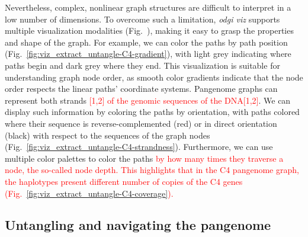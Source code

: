 \documentclass{bioinfo}
\newcommand{\REVIEWED}[1]{{\textcolor{Red}{#1}}}
\begin{document}
Nevertheless, complex, nonlinear graph structures are difficult to interpret in a low number of dimensions.
To overcome such a limitation, \textit{odgi viz} supports multiple visualization modalities (Fig.~), making it easy to grasp the properties and shape of the graph.
For example, we can color the paths by path position (Fig.~\ref{fig:viz_extract_untangle-C4-gradient}), with light grey indicating where paths begin and dark grey where they end.
This visualization is suitable for understanding graph node order, as smooth color gradients indicate that the node order respects the linear paths' coordinate systems.
Pangenome graphs can represent both strands \REVIEWED{[1,2] of the genomic sequences of the DNA[1,2]}.
We can display such information by coloring the paths by orientation, with paths colored where their sequence is reverse-complemented (red) or in direct orientation (black) with respect to the sequences of the graph nodes (Fig.~\ref{fig:viz_extract_untangle-C4-strandness}).
Furthermore, we can use multiple color palettes to color the paths \REVIEWED{by how many times they traverse a node, the so-called node depth.}
\REVIEWED{This highlights that in the C4 pangenome graph, the haplotypes present different number of copies of the C4 genes (Fig.~\ref{fig:viz_extract_untangle-C4-coverage}).}



\subsection{Untangling and navigating the pangenome}
\label{sec:untangle}

\end{document}
